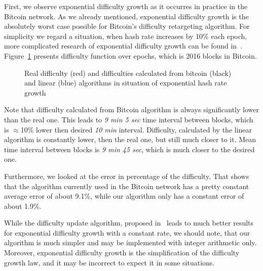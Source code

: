 \documentclass[]{llncs}
\begin{document}
First, we observe exponential difficulty growth as it occurres in practice in the Bitcoin network. As we already mentioned, exponential difficulty growth is the absolutely worst case possible for Bitcoin’s difficulty retargeting algorithm.
For simplicity we regard a situation, when hash rate increases by 10\% each epoch, more complicated research of exponential difficulty growth can be found in~\cite{kraft2015difficulty}.
Figure~\ref{fig:exp} presents difficulty function over epochs, which is 2016 blocks in Bitcoin.

\begin{figure}[h]
\caption{Real difficulty (red) and difficulties calculated from bitcoin (black) and linear (blue) algorithms in situation of exponential hash rate growth}
\label{fig:exp}
\end{figure}

Note that difficulty calculated from Bitcoin algorithm is always significantly lower than the real one.
This leads to \textit{9 min 5 sec} time interval between blocks, which is $\approx$10\% lower then desired \textit{10 min} interval.
Difficulty, calculated by the linear algorithm is constantly lower, then the real one, but still much closer to it.
Mean time interval between blocks is \textit{9 min 45 sec}, which is much closer to the desired one.

Furthermore, we looked at the error in percentage of the difficulty. That shows that the algorithm currently used in the Bitcoin network has a pretty constant average error of about 9.1\%, while our algorithm only has a constant error of about 1.9\%.

While the difficulty update algorithm, proposed in~\cite{kraft2015difficulty} leads to much better results for exponential difficulty growth with a constant rate, we should note, that our algorithm is much simpler and may be implemented with integer arithmetic only.
Moreover, exponential difficulty growth is the simplification of the difficulty growth law, and it may be incorrect to expect it in some situations.
\end{document}
